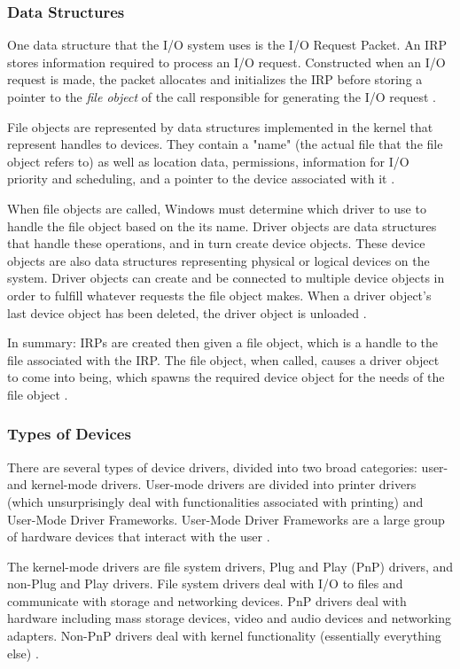 \documentclass[10pt,draftclsnofoot,onecolumn,compsoc]{IEEEtran}
\begin{document}
	
	\subsubsection{Data Structures}
	
	One data structure that the I/O system uses is the I/O Request Packet. An IRP stores information required to process an I/O request. Constructed when an I/O request is made, the packet allocates and initializes the IRP before storing a pointer to the \textit{file object} of the call responsible for generating the I/O request \cite{WInternals}.
	
	File objects are represented by data structures implemented in the kernel that represent handles to devices. They contain a "name" (the actual file that the file object refers to) as well as location data, permissions, information for I/O priority and scheduling, and a pointer to the device associated with it \cite{WInternals}.
	
	When file objects are called, Windows must determine which driver to use to handle the file object based on the its name. Driver objects are data structures that handle these operations, and in turn create device objects. These device objects are also data structures representing physical or logical devices on the system. Driver objects can create and be connected to multiple device objects in order to fulfill whatever requests the file object makes. When a driver object's last device object has been deleted, the driver object is unloaded \cite{WInternals}.
	
	In summary: IRPs are created then given a file object, which is a handle to the file associated with the IRP. The file object, when called, causes a driver object to come into being, which spawns the required device object for the needs of the file object \cite{WInternals}.
	
	\subsubsection{Types of Devices}
	
	There are several types of device drivers, divided into two broad categories: user- and kernel-mode drivers. User-mode drivers are divided into printer drivers (which unsurprisingly deal with functionalities associated with printing) and User-Mode Driver Frameworks. User-Mode Driver Frameworks are a large group of hardware devices that interact with the user \cite{WInternals}.
	
	The kernel-mode drivers are file system drivers, Plug and Play (PnP) drivers, and non-Plug and Play drivers. File system drivers deal with I/O to files and communicate with storage and networking devices. PnP drivers deal with hardware including mass storage devices, video and audio devices and networking adapters. Non-PnP drivers deal with kernel functionality (essentially everything else) \cite{WInternals}.
	
\end{document}
